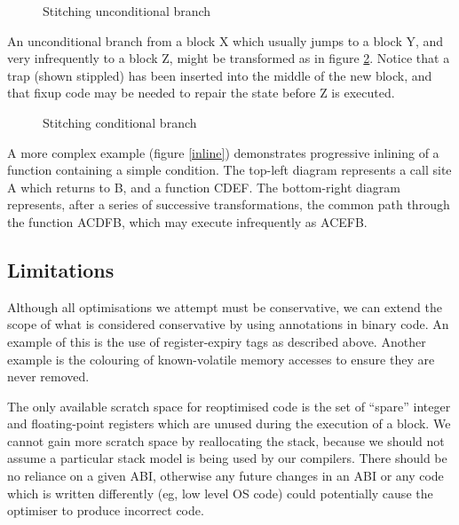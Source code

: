 \documentclass[11pt,letterpaper,twocolumn,notitlepage]{article}
\begin{document}
\begin{figure}[t]
\centerline{}
\caption{\label{uncond}Stitching unconditional branch}
\end{figure}

An unconditional branch from a block X which usually jumps to a block Y, and very infrequently to a block Z, might be transformed as in figure \ref{cond}. Notice that a trap (shown stippled) has been inserted into the middle of the new block, and that fixup code may be needed to repair the state before Z is executed.

\begin{figure}[t]
\centerline{}
\caption{\label{cond}Stitching conditional branch}
\end{figure}

A more complex example (figure \ref{inline}) demonstrates progressive inlining of a function containing a simple condition. The top-left diagram represents a call site A which returns to B, and a function CDEF. The bottom-right diagram represents, after a series of successive transformations, the common path through the function ACDFB, which may execute infrequently as ACEFB.

\begin{figure*}[t]
\centerline{}
\caption{\label{inline}Progressively inlining function}
\end{figure*}

\subsection{Limitations}

Although all optimisations we attempt must be conservative, we can extend the scope of what is considered conservative by using annotations in binary code. An example of this is the use of register-expiry tags as described above. Another example is the colouring of known-volatile memory accesses to ensure they are never removed.

The only available scratch space for reoptimised code is the set of ``spare'' integer and floating-point registers which are unused during the execution of a block. We cannot gain more scratch space by reallocating the stack, because we should not assume a particular stack model is being used by our compilers. There should be no reliance on a given ABI, otherwise any future changes in an ABI or any code which is written differently (eg, low level OS code) could potentially cause the optimiser to produce incorrect code.
\end{document}
